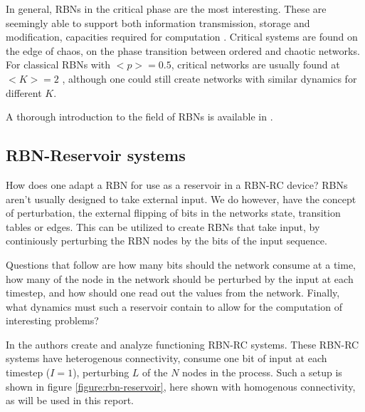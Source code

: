 In general, RBNs in the critical phase are the most interesting.
These are seemingly able to support both information transmission, storage and modification,
capacities required for computation \cite{langton3computation}.
Critical systems are found on the edge of chaos, on the phase transition between ordered and chaotic networks.
For classical RBNs with $<p>=0.5$, critical networks are usually found at $<K>=2$ \cite{gershenson2004introduction},
although one could still create networks with similar dynamics for different $K$.

A thorough introduction to the field of RBNs is available in \cite{gershenson2004introduction}.

\subsection{RBN-Reservoir systems}


How does one adapt a RBN for use as a reservoir in a RBN-RC device?
RBNs aren't usually designed to take external input.
We do however, have the concept of perturbation,
the external flipping of bits in the networks state,
transition tables or edges.
This can be utilized to create RBNs that take input,
by continiously perturbing the RBN nodes by the bits of the input sequence.

Questions that follow are how many bits should the network consume at a time,
how many of the node in the network should be perturbed by the input at each timestep,
and how should one read out the values from the network.
Finally, what dynamics must such a reservoir contain to allow for the computation of interesting problems?

In \cite{rbn-reservoir} the authors create and analyze functioning RBN-RC systems.
These RBN-RC systems have heterogenous connectivity,
consume one bit of input at each timestep ($I=1$),
perturbing $L$ of the $N$ nodes in the process.
Such a setup is shown in figure \ref{figure:rbn-reservoir},
here shown with homogenous connectivity,
as will be used in this report.


